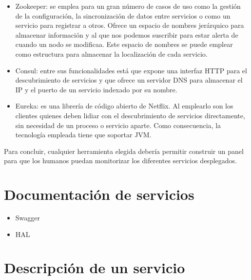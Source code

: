 \documentclass[11pt,a4paper]{article}
\begin{document}
\begin{itemize}

\item Zookeeper: se emplea para un gran número de casos de uso como la gestión de la configuración, la sincronización de datos entre servicios o como un servicio para registrar a otros. Ofrece un espacio de nombres jerárquico para almacenar información y al que nos podemos suscribir para estar alerta de cuando un nodo se modificaa. Este espacio de nombres se puede emplear como estructura para almacenar la localización de cada servicio.

\item Consul: entre sus funcionalidades está que expone una interfaz HTTP para el descubrimiento de servicios y que ofrece un servidor DNS para almacenar el IP y el puerto de un servicio indexado por su nombre.

\item Eureka: es una librería de código abierto de Netflix. Al emplearlo son los clientes quienes deben lidiar con el descubrimiento de servicios directamente, sin necesidad de un proceso o servicio aparte. Como consecuencia, la tecnología empleada tiene que soportar JVM.

\end{itemize}

Para concluir, cualquier herramienta elegida debería permitir construir un panel para que los humanos puedan monitorizar los diferentes servicios desplegados.

\section{Documentación de servicios}

\begin{itemize}
\item Swagger
\item HAL
\end{itemize}

\section{Descripción de un servicio}
\end{document}
